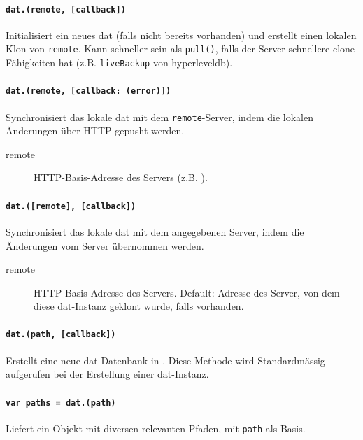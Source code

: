 
\paragraph{\texttt{dat.(remote, [callback])}}
Initialisiert ein neues dat (falls nicht bereits vorhanden) und erstellt einen lokalen Klon von \texttt{remote}. Kann schneller sein als \texttt{pull()}, falls der Server schnellere clone-Fähigkeiten hat (z.B. \texttt{liveBackup} von hyperleveldb).


\paragraph{\texttt{dat.(remote, [callback: (error)])}}
Synchronisiert das lokale dat mit dem \texttt{remote}-Server, indem die lokalen Änderungen über HTTP gepusht werden.

\begin{description}
\item[remote] HTTP-Basis-Adresse des Servers (z.B. ).
\end{description}

\paragraph{\texttt{dat.([remote], [callback])}}
Synchronisiert das lokale dat mit dem angegebenen Server, indem die Änderungen vom Server übernommen werden.

\begin{description}
\item[remote] HTTP-Basis-Adresse des Servers. Default: Adresse des Server, von dem diese dat-Instanz geklont wurde, falls vorhanden.
\end{description}

\paragraph{\texttt{dat.(path, [callback])}}
Erstellt eine neue dat-Datenbank in . Diese Methode wird Standardmässig aufgerufen bei der Erstellung einer dat-Instanz.

\paragraph{\texttt{var paths = dat.(path)}}
Liefert ein Objekt mit diversen relevanten Pfaden, mit \texttt{path} als Basis.

